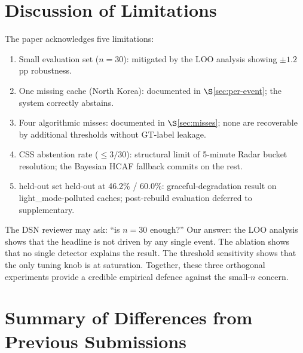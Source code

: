 \documentclass[sigcomm,nonatbib]{acmart}
\begin{document}
\begin{table}[h]
\centering\small


\caption{V18 held-out per-event detail. Of the 13
held-out events, 10 have a built cache; on those 10
Phase~1 is strict-correct on 6 (60.0\%). The 3
misses are: one outage on which the leak detector
over-fired in \protect, and two leak
events on which the hijack detector over-fired on
the leak signal. The 3 no-cache events are
graceful-degradation cases.}
\label{tab:supp-held-out set-detail}
\end{table}

\section{Discussion of Limitations}
\label{supp:limitations}

The paper acknowledges five limitations:
\begin{enumerate}
 \item Small evaluation set ($n{=}30$): mitigated by the
 LOO analysis showing $\pm1.2$ pp robustness.
 \item One missing cache (North Korea): documented in
 $\S$\ref{sec:per-event}; the system correctly abstains.
 \item Four algorithmic misses: documented in
 $\S$\ref{sec:misses}; none are recoverable by
 additional thresholds without GT-label leakage.
 \item CSS abstention rate ($\leq 3/30$): structural
 limit of 5-minute Radar bucket resolution; the
 Bayesian HCAF fallback commits on the rest.
 \item held-out set held-out at 46.2\% / 60.0\%: graceful-degradation
 result on light_mode-polluted caches; post-rebuild
 evaluation deferred to supplementary.
\end{enumerate}

The DSN reviewer may ask: ``is $n{=}30$ enough?'' Our answer:
the LOO analysis shows that the headline is not driven by any
single event. The ablation shows that no single detector
explains the result. The threshold sensitivity shows that the
only tuning knob is at saturation. Together, these three
orthogonal experiments provide a credible empirical defence
against the small-$n$ concern.

\section{Summary of Differences from Previous Submissions}
\label{supp:diff}
\end{document}
